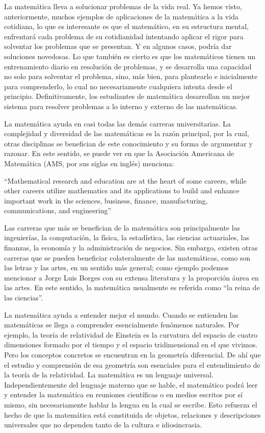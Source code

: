 La matemática lleva a solucionar problemas de la vida real. Ya hemos visto, anteriormente, muchos ejemplos de aplicaciones de la matemática a la vida cotidiana, lo que es interesante es que el matemático, en su estructura mental, enfrentará cada problema de su cotidianidad intentando aplicar el rigor para solventar los problemas que se presentan. Y en algunos casos, podría dar soluciones novedosas. Lo que también es cierto es que los matemáticos tienen un entrenamiento diario en resolución de problemas, y se desarrolla una capacidad no solo para solventar el problema, sino, más bien, para plantearlo e inicialmente para comprenderlo, lo cual no necesariamente cualquiera intenta desde el principio. Definitivamente, los estudiantes de matemática desarrollan un mejor sistema para resolver problemas a lo interno y externo de las matemáticas.

La matemática ayuda en casi todas las demás carreras universitarias.  La complejidad y diversidad de las matemáticas es la razón principal, por la cual, otras disciplinas se benefician de este conocimiento y su forma de argumentar y razonar.  En este sentido, se puede ver en \cite{ams2014careers} que la Asociación Americana de Matemática (AMS, por sus siglas en inglés) menciona: 

    “Mathematical research and education are at the heart of some careers, while other careers utilize mathematics and its applications to build and enhance important work in the sciences, business, finance, manufacturing, communications, and engineering”

Las carreras que más se benefician de la matemática son principalmente las ingenierías, la computación, la física, la estadística, las ciencias actuariales, las finanzas, la economía y la administración de negocios. Sin embargo, existen otras carreras que se pueden beneficiar colateralmente de las matemáticas, como son las letras y las artes, en un sentido más general; como ejemplo podemos mencionar a Jorge Luis Borges con su extensa literatura y la proporción áurea en las artes.  En este sentido, la matemática usualmente es referida como “la reina de las ciencias”.

La matemática ayuda a entender mejor el mundo.  Cuando se entienden las matemáticas se llega a comprender esencialmente fenómenos naturales. Por ejemplo, la teoría de relatividad de Einstein es la curvatura del espacio de cuatro dimensiones formado por el tiempo y el espacio tridimensional en el que vivimos.  Pero los conceptos concretos se encuentran en la geometría diferencial.  De ahí que el estudio y comprensión de esa geometría son esenciales para el entendimiento de la teoría de la relatividad. 
La matemática es un lenguaje universal.  Independientemente del lenguaje materno que se hable, el matemático podrá leer y entender la matemática en reuniones científicas o en medios escritos por sí mismo, sin necesariamente hablar la lengua en la cual se escribe. Esto refuerza el hecho de que la matemática está constituida de objetos, relaciones y descripciones universales que no dependen tanto de la cultura e idiosincrasia.  

